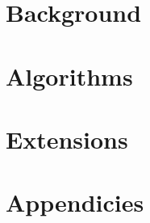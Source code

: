 \documentclass[a4paper, 11pt]{book}
\begin{document}

\frontmatter
	\maketitle	
		
	\setcounter{tocdepth}{1}
	\tableofcontents
	
	
	
\mainmatter 
	\part{Background}
	
		
	\part{Algorithms}
	
	
	
	
	
	
	
	
	\part{Extensions}
	


  \part{Appendicies}
	\begin{appendix}
		
	\end{appendix}	
	
\backmatter
	\cleardoublepage{} 
	\printindex
\end{document}
